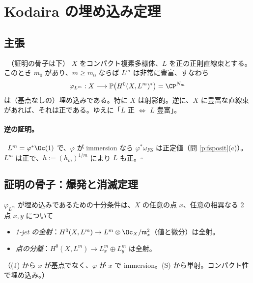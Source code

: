 
\section{Kodaira の埋め込み定理}\label{sec:emb}\label{sec:emb0}

\subsection{主張}
\begin{thm}\label{thm:kodairaemb}\tC\ （証明の骨子は下）
$X$ をコンパクト複素多様体、$L$ を正の正則直線束とする。このとき $m_0$ があり、$m\ge m_0$ ならば $L^m$ は非常に豊富、すなわち
\[
\varphi_{L^m}:X\longrightarrow\mathbb P\big(H^0(X,L^m)^*\big)=\CP^{N_m}
\]
は（基点なしの）埋め込みである。特に $X$ は射影的。逆に、$X$ に豊富な直線束があれば、それは正である。ゆえに「$L$ 正 $\iff$ $L$ 豊富」。
\end{thm}
\paragraph{逆の証明。}\tP\ $L^m=\varphi^*\Oc(1)$ で、$\varphi$ が immersion なら $\varphi^*\omega_{FS}$ は正定値（問 \ref{p:fsposit}(c)）。$L^m$ は正で、$h:=(h_m)^{1/m}$ により $L$ も正。\hfill$\square$

\subsection{証明の骨子：爆発と消滅定理}
$\varphi_{L^m}$ が埋め込みであるための十分条件は、$X$ の任意の点 $x$、任意の相異なる 2 点 $x,y$ について
\begin{itemize}
\item[(J)] \emph{1-jet の全射}：$H^0(X,L^m)\to L^m\otimes\Oc_X/\mathfrak m_x^2$（値と微分）は全射。
\item[(S)] \emph{点の分離}：$H^0(X,L^m)\to L^m_x\oplus L^m_y$ は全射。
\end{itemize}
（(J) から $x$ が基点でなく、$\varphi$ が $x$ で immersion。(S) から単射。コンパクト性で埋め込み。）

